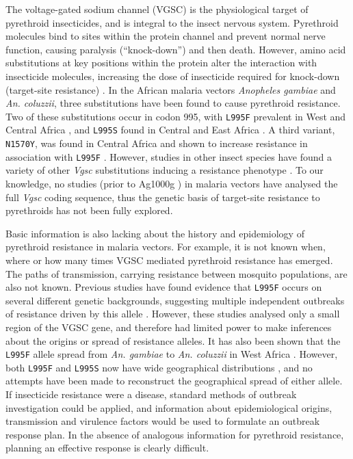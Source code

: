 \documentclass[a4paper,11pt,abstracton,hidelinks]{scrartcl}
\begin{document}
The voltage-gated sodium channel (VGSC) is the physiological target of pyrethroid insecticides, and is integral to the insect nervous system. 
%
Pyrethroid molecules bind to sites within the protein channel and prevent normal nerve function, causing paralysis (``knock-down'') and then death. 
%
However, amino acid substitutions at key positions within the protein alter the interaction with insecticide molecules, increasing the dose of insecticide required for knock-down (target-site resistance) \cite{Davies2007a}. 
%
In the African malaria vectors \textit{Anopheles gambiae} and \textit{An. coluzzii}, three substitutions have been found to cause pyrethroid resistance. 
%
Two of these substitutions occur in codon 995\footnotemark, with \texttt{L995F} prevalent in West and Central Africa \cite{Martinez-Torres1998,Silva2014}, and \texttt{L995S} found in Central and East Africa \cite{Ranson2000,Silva2014}. 
%
%
A third variant, \texttt{N1570Y}, was found in Central Africa and shown to increase resistance in association with \texttt{L995F} \cite{Jones2012}.
%
However, studies in other insect species have found a variety of other \emph{Vgsc} substitutions inducing a resistance phenotype \cite{Davies2007b,Rinkevich2013,Dong2014}. 
%
To our knowledge, no studies (prior to Ag1000g \cite{Ag1000gConsortium2017}) in malaria vectors have analysed the full \emph{Vgsc} coding sequence, thus the genetic basis of target-site resistance to pyrethroids has not been fully explored.


Basic information is also lacking about the history and epidemiology of pyrethroid resistance in malaria vectors. 	
%
For example, it is not known when, where or how many times VGSC mediated pyrethroid resistance has emerged. 
%
The paths of transmission, carrying resistance between mosquito populations, are also not known. 
%
Previous studies have found evidence that \texttt{L995F} occurs on several different genetic backgrounds, suggesting multiple independent outbreaks of resistance driven by this allele \cite{Pinto2007,Etang2009,Santolamazza2015}. 
%
However, these studies analysed only a small region of the VGSC gene, and therefore had limited power to make inferences about the origins or spread of resistance alleles. 
%
It has also been shown that the \texttt{L995F} allele spread from \textit{An. gambiae} to \textit{An. coluzzii} in West Africa \cite{Clarkson2014,Norris2015}. 
%
However, both \texttt{L995F} and \texttt{L995S} now have wide geographical distributions \cite{Silva2014}, and no attempts have been made to reconstruct the geographical spread of either allele. 
%
If insecticide resistance were a disease, standard methods of outbreak investigation could be applied, and information about epidemiological origins, transmission and virulence factors would be used to formulate an outbreak response plan. 
%
In the absence of analogous information for pyrethroid resistance, planning an effective response is clearly difficult.
\end{document}
